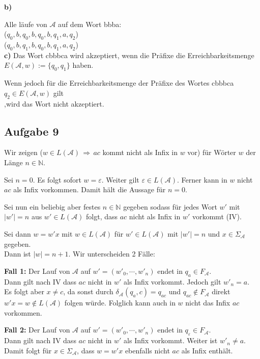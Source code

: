 \documentclass[a4paper,graphics,11pt]{article}
\newcommand{\aufgabe}[1]{\subsection*{Aufgabe #1}}
\begin{document}
\textbf{b)}

Alle läufe von $\mathcal{A}$ auf dem Wort bbba:\\
($q_0,b,q_0,b,q_0,b,q_1,a,q_2$)\\
($q_0,b,q_1,b,q_0,b,q_1,a,q_2$)\\

\textbf{c)}
Das Wort cbbbca wird akzeptiert, wenn die Präfixe die Erreichbarkeitsmenge\\
$E(\mathcal{A},w):=\{q_0,q_1\}$  haben.

Wenn jedoch für  die Erreichbarkeitsmenge der Präfixe des Wortes cbbbca $q_2 \in E(\mathcal{A},w)$ gilt\\,wird  das Wort nicht akzeptiert.



\newpage
\aufgabe{9}
Wir zeigen ($w \in L(\mathcal{A}) \,\Longrightarrow\, ac$ kommt nicht als Infix in $w$ vor) für Wörter $w$ der Länge
$n \in \mathbb{N}$.

Sei $n = 0$. Es folgt sofort $w = \varepsilon$. Weiter gilt $\varepsilon \in L(\mathcal{A})$. Ferner kann in $w$ nicht $ac$ als Infix vorkommen.
Damit hält die Aussage für $n = 0$.

Sei nun ein beliebig aber festes $n \in \mathbb{N}$ gegeben sodass
für jedes Wort $w'$ mit $|w'| = n$ aus $w' \in L(\mathcal{A})$ folgt, dass $ac$ nicht als Infix in $w'$ vorkommt (IV).

Sei dann $w = w'x$ mit $w \in L(\mathcal{A})$ für $w' \in L(\mathcal{A})$ mit $|w'| = n$ und $x \in \Sigma_\mathcal{A}$ gegeben.\\
Dann ist $|w| = n+1$. Wir unterscheiden 2 Fälle:

\textbf{Fall 1:} Der Lauf von $\mathcal{A}$ auf $w' = (w'_0, \cdots, w'_n)$ endet in $q_a \in F_{\mathcal{A}}$.\\
Dann gilt nach IV dass $ac$ nicht in $w'$ als Infix vorkommt. Jedoch gilt $w'_n = a$. \\
Es folgt aber $x \neq c$, da sonst durch $\delta_\mathcal{A}(q_a, c) = q_{ac}$ und $q_{ac} \notin F_{\mathcal{A}}$ direkt $w'x = w \notin L(\mathcal{A})$ folgen würde. Folglich kann auch in $w$ nicht das Infix $ac$ vorkommen.

\textbf{Fall 2:} Der Lauf von $\mathcal{A}$ auf $w' = (w'_0, \cdots, w'_n)$ endet in $q_{\varepsilon} \in F_{\mathcal{A}}$.\\
Dann gilt nach IV dass $ac$ nicht in $w'$ als Infix vorkommt. Weiter ist $w'_n \neq a$. Damit folgt
für $x \in \Sigma_\mathcal{A}$, dass $w = w'x$ ebenfalls nicht $ac$ als Infix enthält.
\end{document}
